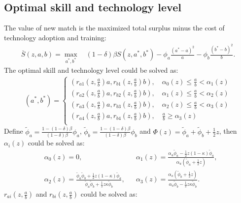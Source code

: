 \documentclass[12pt]{article}
\newcommand{\1}{\mathbb{1}}
\begin{document}
\subsection{Optimal skill and technology level}
The value of new match is the maximized total surplus minus the cost of technology adoption and training: 
\begin{align*}
\bar{S}(z,a,b) = \max _{a^*,b^*} \quad (1-\delta)\beta S(z,a^*,b^*)-\phi_a\frac{(a^*-a)^2}{a}-\phi_b\frac{(b^*-b)^2}{b}.
\end{align*}
The optimal skill and technology level could be solved as: 
\begin{align*}
(a^*,b^*) = 
\begin{cases}
(r_{a1}(z,\frac{a}{b})a, r_{b1}(z,\frac{a}{b})b), \quad \alpha_0(z) \leq \frac{a}{b}<\alpha_1(z) \\
(r_{a2}(z,\frac{a}{b})a, r_{b2}(z,\frac{a}{b})b), \quad \alpha_1(z) \leq \frac{a}{b}<\alpha_2(z) \\
(r_{a3}(z,\frac{a}{b})a, r_{b3}(z,\frac{a}{b})b), \quad \alpha_2(z) \leq \frac{a}{b}<\alpha_3(z) \\
(r_{a4}(z,\frac{a}{b})a, r_{b4}(z,\frac{a}{b})b), \quad  \frac{a}{b}\geq\alpha_3(z) \\
\end{cases}
\end{align*}
Define $\tilde{\phi}_a = \frac{1-(1-\delta)\beta}{(1-\delta)\beta}\phi_a$, $\tilde{\phi}_b =\frac{1-(1-\delta)\beta}{(1-\delta)\beta}\phi_b$ and $\Phi(z) = \tilde{\phi}_a+\tilde{\phi}_b+\frac{1}{2}z$, then $\alpha_{i}(z)$ could be solved as: 
\begin{align*}
&\alpha_0(z)= 0,
&&\alpha_1(z) = \frac{\alpha_u\tilde{\phi}_a-\frac{1}{2}z(1-\kappa)\tilde{\phi}_a}{\alpha_u(\tilde{\phi}_a+\frac{1}{2}z)},  \\
&\alpha_2(z) = \frac{\tilde{\phi}_a\tilde{\phi}_b+\frac{1}{2}z(1-\kappa)\tilde{\phi}_a}{\tilde{\phi}_a\tilde{\phi}_b+\frac{1}{2}z\kappa\tilde{\phi}_b},
&&\alpha_3(z) = \frac{\alpha_o(\tilde{\phi}_b+\frac{1}{2}z)}{\alpha_o\tilde{\phi}_b-\frac{1}{2}z\kappa\tilde{\phi}_b}.
\end{align*}
$r_{ai}(z,\frac{a}{b})$ and $r_{bi}(z,\frac{a}{b})$ could be solved as: 
\end{document}
